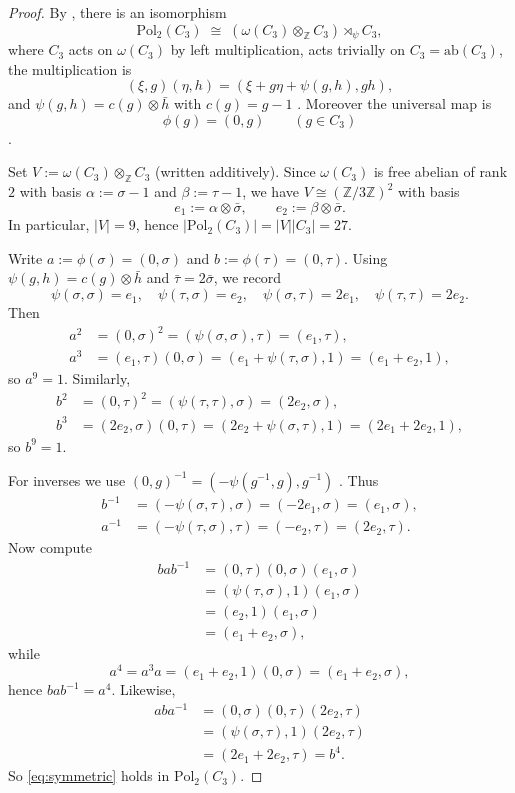 \documentclass[11pt, a4paper]{amsproc}
\theoremstyle{remark}
\theoremstyle{plain}
\begin{document}
\begin{proof}
By \cite[Theorem~1.3]{AJ}, there is an isomorphism
\[
\mathrm{Pol}_2(C_3)\;\cong\;(\omega(C_3)\otimes_{\mathbb Z} C_3)\rtimes_{\psi} C_3,
\]
where $C_3$ acts on $\omega(C_3)$ by left multiplication, acts trivially on $C_3=\mathrm{ab}(C_3)$,
the multiplication is
\[
(\xi,g)(\eta,h)=(\xi+g\eta+\psi(g,h),gh),
\]
and $\psi(g,h)=c(g)\otimes \bar h$ with $c(g)=g-1$ \cite[Theorem~1.3 and its proof]{AJ}. Moreover the universal map is
\[
\phi(g)=(0,g)\qquad(g\in C_3)
\]
\cite[proof of Theorem~1.3]{AJ}.

Set $V:=\omega(C_3)\otimes_{\mathbb Z} C_3$ (written additively).
Since $\omega(C_3)$ is free abelian of rank $2$ with basis
$\alpha:=\sigma-1$ and $\beta:=\tau-1$, we have $V\cong (\mathbb Z/3\mathbb Z)^2$ with basis
\[
e_1:=\alpha\otimes \bar\sigma,\qquad e_2:=\beta\otimes \bar\sigma.
\]
In particular, $|V|=9$, hence $|\mathrm{Pol}_2(C_3)|=|V||C_3|=27$.

Write $a:=\phi(\sigma)=(0,\sigma)$ and $b:=\phi(\tau)=(0,\tau)$.
Using $\psi(g,h)=c(g)\otimes \bar h$ and $\bar\tau=2\bar\sigma$, we record
\[
\psi(\sigma,\sigma)=e_1,\quad \psi(\tau,\sigma)=e_2,\quad
\psi(\sigma,\tau)=2e_1,\quad \psi(\tau,\tau)=2e_2.
\]
Then
\begin{align*}
a^2 &= (0,\sigma)^2=(\psi(\sigma,\sigma),\tau)=(e_1,\tau),\\
a^3 &= (e_1,\tau)(0,\sigma)=(e_1+\psi(\tau,\sigma),1)=(e_1+e_2,1),
\end{align*}
so $a^9=1$. Similarly,
\begin{align*}
b^2 &= (0,\tau)^2=(\psi(\tau,\tau),\sigma)=(2e_2,\sigma),\\
b^3 &= (2e_2,\sigma)(0,\tau)=(2e_2+\psi(\sigma,\tau),1)=(2e_1+2e_2,1),
\end{align*}
so $b^9=1$.

For inverses we use $(0,g)^{-1}=(-\psi(g^{-1},g),g^{-1})$ \cite[proof of Theorem~1.3]{AJ}.
Thus
\begin{align*}
b^{-1} &= (-\psi(\sigma,\tau),\sigma)=(-2e_1,\sigma)=(e_1,\sigma),\\
a^{-1} &= (-\psi(\tau,\sigma),\tau)=(-e_2,\tau)=(2e_2,\tau).
\end{align*}
Now compute
\begin{align*}
bab^{-1}
&=(0,\tau)(0,\sigma)(e_1,\sigma)\\
&=(\psi(\tau,\sigma),1)(e_1,\sigma)\\
&=(e_2,1)(e_1,\sigma)\\
&=(e_1+e_2,\sigma),
\end{align*}
while
\[
a^4=a^3a=(e_1+e_2,1)(0,\sigma)=(e_1+e_2,\sigma),
\]
hence $bab^{-1}=a^4$. Likewise,
\begin{align*}
aba^{-1}
&=(0,\sigma)(0,\tau)(2e_2,\tau)\\
&=(\psi(\sigma,\tau),1)(2e_2,\tau)\\
&=(2e_1+2e_2,\tau)=b^4.
\end{align*}
So \eqref{eq:symmetric} holds in $\mathrm{Pol}_2(C_3)$.


\end{proof}
\end{document}
